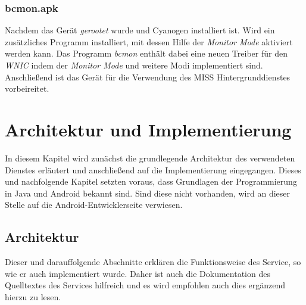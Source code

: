 \documentclass[]{report}
\begin{document}
\subsection{bcmon.apk}
Nachdem das Gerät \textit{gerootet} wurde und Cyanogen installiert ist. Wird ein zusätzliches Programm installiert, mit dessen Hilfe der \textit{Monitor Mode} aktiviert werden kann. Das Programm \textit{bcmon}\cite{bcmon.apk} enthält dabei eine neuen Treiber für den \textit{WNIC} indem der \textit{Monitor Mode} und weitere Modi implementiert sind. Anschließend ist das Gerät für die Verwendung des MISS Hintergrunddienstes vorbeireitet. 
\chapter{Architektur und Implementierung}
In diesem Kapitel wird zunächst die grundlegende Architektur des verwendeten Dienstes erläutert und anschließend auf die Implementierung eingegangen. Dieses und nachfolgende Kapitel setzten voraus, dass Grundlagen der Programmierung in Java und Android bekannt sind. Sind diese nicht vorhanden, wird an dieser Stelle auf die Android-Entwicklerseite\cite{AndroidDeveoper} verwiesen. 
\section{Architektur}
Dieser und darauffolgende Abschnitte erklären die Funktionsweise des Service, so wie er auch implementiert wurde. Daher ist auch die Dokumentation des Quelltextes des Services hilfreich und es wird empfohlen auch dies ergänzend hierzu zu lesen. 
\end{document}
